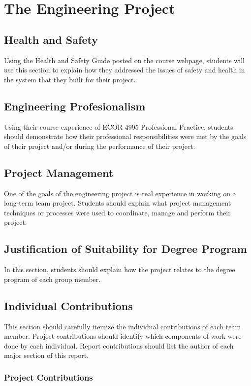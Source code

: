 \documentclass[titlepage]{article}
\begin{document}
\section{The Engineering Project}

\subsection{Health and Safety}
Using the Health and Safety Guide posted on the course webpage, 
students will use this section to explain how they addressed 
the issues of safety and health in the system that they built 
for their project.

\subsection{Engineering Profesionalism}
Using their course experience of ECOR 4995 Professional Practice,
 students should demonstrate how their professional responsibilities 
 were met by the goals of their project and/or during the 
 performance of their project.

\subsection{Project Management}
One of the goals of the engineering project is real experience 
in working on a long-term team project. Students should explain 
what project management techniques or processes were used to 
coordinate, manage and perform their project.

\subsection{Justification of Suitability for Degree Program}
In this section, students should explain how the project 
relates to the degree program of each group member.
\subsection{Individual Contributions}
This section should carefully itemize the individual 
contributions of each team member. Project contributions 
should identify which components of work were done by each 
individual. Report contributions should list the author of 
each major section of this report.

\subsubsection{Project Contributions}
\end{document}
